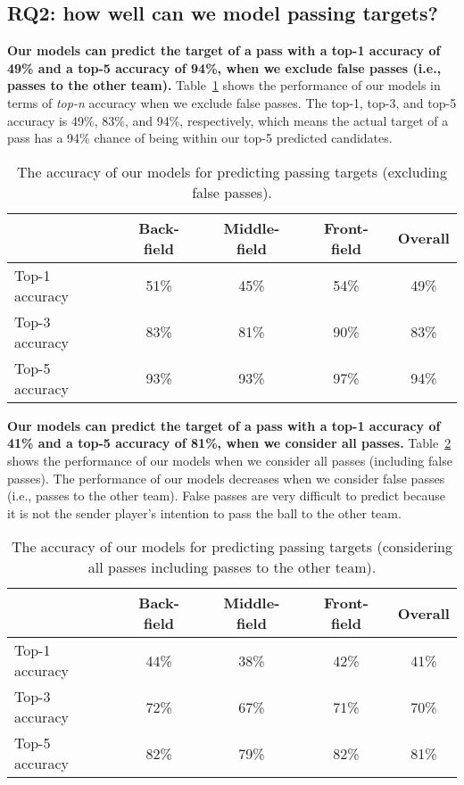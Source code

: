 \subsection{RQ2: how well can we model passing targets?}\label{RQ2-results}

\textbf{Our models can predict the target of a pass with a top-1 accuracy of 49\% and a top-5 accuracy of 94\%, when we exclude false passes (i.e., passes to the other team).}
Table~\ref{tab:performance-accurate-passes} shows the performance of our models in terms of \textit{top-n} accuracy when we exclude false passes. 
The top-1, top-3, and top-5 accuracy is 49\%, 83\%, and 94\%, respectively, which means the actual target of a pass has a 94\% chance of being within our top-5 predicted candidates.

\begin{table}[!t]
\caption{The accuracy of our models for predicting passing targets (excluding false passes).}
\centering
\begin{tabular}{lcccc}
  \hline
  & Back-field & Middle-field & Front-field & Overall \\
  \hline
  Top-1 accuracy & 51\% & 45\% & 54\% & 49\% \\
  Top-3 accuracy & 83\% & 81\% & 90\% & 83\% \\
  Top-5 accuracy & 93\% & 93\% & 97\% & 94\% \\
  \hline
\end{tabular}
\label{tab:performance-accurate-passes}
\end{table}

\textbf{Our models can predict the target of a pass with a top-1 accuracy of 41\% and a top-5 accuracy of 81\%, when we consider all passes.}
Table~\ref{tab:performance-all-passes} shows the performance of our models when we consider all passes (including false passes). 
The performance of our models decreases when we consider false passes (i.e., passes to the other team). 
False passes are very difficult to predict because it is not the sender player's intention to pass the ball to the other team. 

\begin{table}[!t]
\caption{The accuracy of our models for predicting passing targets (considering all passes including passes to the other team).}
\centering
\begin{tabular}{lcccc}
  \hline
  & Back-field & Middle-field & Front-field & Overall \\
  \hline
  Top-1 accuracy & 44\% & 38\% & 42\% & 41\% \\
  Top-3 accuracy & 72\% & 67\% & 71\% & 70\% \\
  Top-5 accuracy & 82\% & 79\% & 82\% & 81\% \\
  \hline
\end{tabular}
\label{tab:performance-all-passes}
\end{table}


